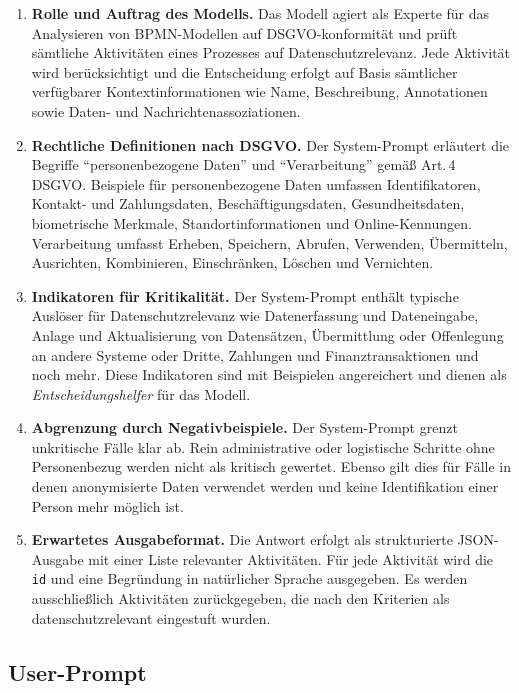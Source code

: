 \begin{enumerate}
    \item \textbf{Rolle und Auftrag des Modells.} Das Modell agiert als Experte für das Analysieren von \ac{BPMN}-Modellen auf \ac{DSGVO}-konformität und prüft sämtliche Aktivitäten eines Prozesses auf Datenschutzrelevanz. Jede Aktivität wird berücksichtigt und die Entscheidung erfolgt auf Basis sämtlicher verfügbarer Kontextinformationen wie Name, Beschreibung, Annotationen sowie Daten- und Nachrichtenassoziationen.
    \item \textbf{Rechtliche Definitionen nach \ac{DSGVO}.} Der System-Prompt erläutert die Begriffe \enquote{personenbezogene Daten} und \enquote{Verarbeitung} gemäß Art.\,4 \ac{DSGVO}. Beispiele für personenbezogene Daten umfassen Identifikatoren, Kontakt- und Zahlungsdaten, Beschäftigungsdaten, Gesundheitsdaten, biometrische Merkmale, Standortinformationen und Online-Kennungen. Verarbeitung umfasst Erheben, Speichern, Abrufen, Verwenden, Übermitteln, Ausrichten, Kombinieren, Einschränken, Löschen und Vernichten.
    \item \textbf{Indikatoren für Kritikalität.} Der System-Prompt enthält typische Auslöser für Datenschutzrelevanz wie Datenerfassung und Dateneingabe, Anlage und Aktualisierung von Datensätzen, Übermittlung oder Offenlegung an andere Systeme oder Dritte, Zahlungen und Finanztransaktionen und noch mehr. Diese Indikatoren sind mit Beispielen angereichert und dienen als \emph{Entscheidungshelfer} für das Modell.
    \item \textbf{Abgrenzung durch Negativbeispiele.} Der System-Prompt grenzt unkritische Fälle klar ab. Rein administrative oder logistische Schritte ohne Personenbezug werden nicht als kritisch gewertet. Ebenso gilt dies für Fälle in denen anonymisierte Daten verwendet werden und keine Identifikation einer Person mehr möglich ist.
    \item \textbf{Erwartetes Ausgabeformat.} Die Antwort erfolgt als strukturierte JSON-Ausgabe mit einer Liste relevanter Aktivitäten. Für jede Aktivität wird die \texttt{id} und eine Begründung in natürlicher Sprache ausgegeben. Es werden ausschließlich Aktivitäten zurückgegeben, die nach den Kriterien als datenschutzrelevant eingestuft wurden.
\end{enumerate}

\subsection*{User-Prompt}

